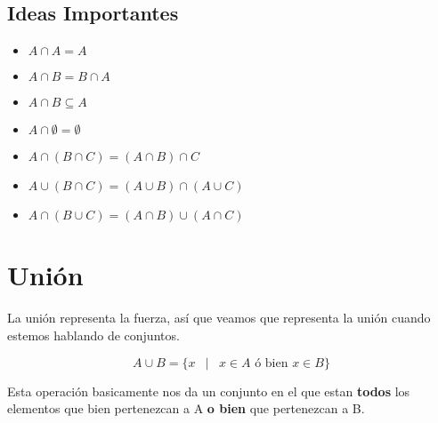 \documentclass[12pt, fleqn]{report}                             %
\DeclareMathOperator \Space {\quad}                             %
\DeclareMathOperator \MiniSpace {\;}                            %
\newcommand \Such {\MiniSpace|\MiniSpace}                       %
\begin{document}
            \subsection{Ideas Importantes}

                \begin{itemize}
                    \item $A \cap A = A$

                    \item $A \cap B = B \cap A$

                    \item $A \cap B \subseteq A$

                    \item $A \cap \emptyset = \emptyset$

                    \item $A \cap (B \cap C) = (A \cap B) \cap C$

                    \item $A \cup (B \cap C) = (A \cup B) \cap (A \cup C)$

                    \item $A \cap (B \cup C) = (A \cap B) \cup (A \cap C)$
                \end{itemize}


        \clearpage
        \section{Unión}

            La unión representa la fuerza, así que veamos que representa la unión cuando estemos
            hablando de conjuntos.

            \begin{equation}
                A \cup B = \{ x \Such x \in A \text{ ó bien } x \in B \}
            \end{equation}

            Esta operación basicamente nos da un conjunto en el que estan \textbf{todos} los elementos
            que bien pertenezcan a A \textbf{o bien} que pertenezcan a B.

\end{document}
